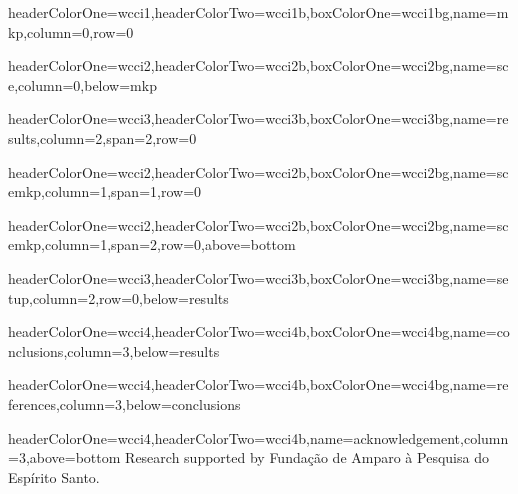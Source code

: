 \documentclass[landscape,final,a0paper,fontscale=0.38]{baposter}
\newenvironment{cframed}[1][white]
  {\begin{mdframed}[linewidth=0,backgroundcolor=#1] }
  {\end{mdframed}}
\newcommand{\myBoxEnv}[2]{\begin{cframed}[#1] #2 \end{cframed}}
\begin{document}
\begin{poster}
  {headerColorOne=wcci1,headerColorTwo=wcci1b,boxColorOne=wcci1bg,name=mkp,column=0,row=0}
  {\myBoxEnv{wcci1bg}{}}

  {headerColorOne=wcci2,headerColorTwo=wcci2b,boxColorOne=wcci2bg,name=sce,column=0,below=mkp}
  {\myBoxEnv{wcci2bg}{ }}

  {headerColorOne=wcci3,headerColorTwo=wcci3b,boxColorOne=wcci3bg,name=results,column=2,span=2,row=0}
  {\myBoxEnv{wcci3bg}{ }}

  {headerColorOne=wcci2,headerColorTwo=wcci2b,boxColorOne=wcci2bg,name=scemkp,column=1,span=1,row=0}
  {\myBoxEnv{wcci2bg}{}}

  {headerColorOne=wcci2,headerColorTwo=wcci2b,boxColorOne=wcci2bg,name=scemkp,column=1,span=2,row=0,above=bottom}
  {\myBoxEnv{wcci2bg}{ }}

  {headerColorOne=wcci3,headerColorTwo=wcci3b,boxColorOne=wcci3bg,name=setup,column=2,row=0,below=results}
  {\myBoxEnv{wcci3bg}{ }}

  {headerColorOne=wcci4,headerColorTwo=wcci4b,boxColorOne=wcci4bg,name=conclusions,column=3,below=results}
  {\myBoxEnv{wcci4bg}{  }}


  {headerColorOne=wcci4,headerColorTwo=wcci4b,boxColorOne=wcci4bg,name=references,column=3,below=conclusions}
  {  }

  {headerColorOne=wcci4,headerColorTwo=wcci4b,name=acknowledgement,column=3,above=bottom}
  { Research supported by Funda\c c\~ao de Amparo \`a Pesquisa do Esp\'irito Santo.  }

\end{poster}
\end{document}
